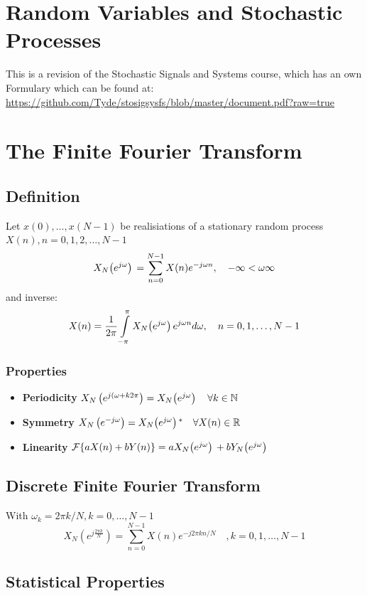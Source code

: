 \documentclass[accentcolor=tud4c,9.5pt,nochapname,bigchapter,paper=a5report]{tudreport}
\begin{document}
\chapter{Random Variables and Stochastic Processes}
This is a revision of the Stochastic Signals and Systems course, which has an own Formulary which can be found at:
\url{https://github.com/Tyde/stosigsysfs/blob/master/document.pdf?raw=true}
\chapter{The Finite Fourier Transform}
\section{Definition}
Let $x(0),\ldots,x(N-1)$ be realisiations of a stationary random process $X(n),n=0,1,2,\ldots,N-1$
\begin{equation}
X_N{\left(e^{j\omega}\right)}\, = \sum\limits_{n=0}^{N-1}X(n)e^{-j\omega n}, \quad -\infty < \omega \infty 
\end{equation} 
and inverse:
\begin{equation}
X(n)=\frac{1}{2\pi}\int\limits_{-\pi}^{\pi}X_N{\left(e^{j\omega}\right)}\, e^{j\omega n}d\omega, \quad n=0,1,\ldots,N-1
\end{equation}

\subsection{Properties}
\begin{itemize}
  \item {\bf Periodicity} $X_N\left(e^{j(\omega +k2\pi}\right)=X_N{\left(e^{j\omega}\right)}\,\quad\forall k \in \mathbb{N}$
  \item {\bf Symmetry} $X_N\left(e^{-j\omega}\right)=X_N{\left(e^{j\omega}\right)}\,^{*}\quad \forall X(n) \in \mathbb{R}$
  \item {\bf Linearity} $\mathcal{F}\{aX(n)+bY(n)\} = aX_N{\left(e^{j\omega}\right)}\, + bY_N{\left(e^{j\omega}\right)}\,$
\end{itemize}
\section{Discrete Finite Fourier Transform}
With $\omega_k=2\pi k/N, k=0,\ldots,N-1$
\begin{equation}
X_N(e^{j\frac{2\pi k}{N}})=\sum\limits_{n=0}^{N-1}X(n)e^{-j2\pi kn/N} \quad,k=0,1,\ldots,N-1
\end{equation}

\section{Statistical Properties}
\end{document}
